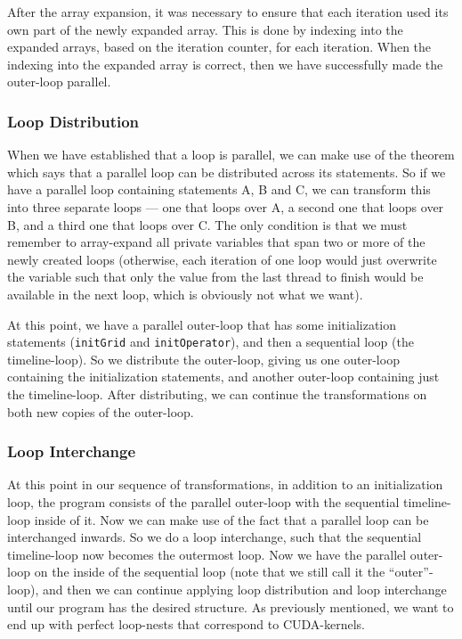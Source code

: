 \documentclass[11pt]{article}
\begin{document}
After the array expansion,
it was necessary to ensure that each iteration used its own part of the newly
expanded array. This is done by indexing into the expanded arrays, based on the
iteration counter, for each iteration. When the indexing into the expanded
array is correct, then we have successfully made the outer-loop parallel.

\subsubsection{Loop Distribution}
When we have established that a loop is parallel, we can make use of the theorem which says that a parallel loop can be distributed across its statements.
So if we have a parallel loop containing statements A, B and C, we can transform this into three separate loops ---
one that loops over A, a second one that loops over B, and a third one that loops over C.
The only condition is that we must remember to array-expand all private variables that span two or more of the newly created loops (otherwise, each iteration of one loop would just overwrite the variable such that only the value from the last thread to finish would be available in the next loop, which is obviously not what we want).

At this point, we have a parallel outer-loop that has some initialization statements (\texttt{initGrid} and \texttt{initOperator}), and then a sequential loop (the timeline-loop).
So we distribute the outer-loop, giving us one outer-loop containing the initialization statements, and another outer-loop containing just the timeline-loop.
After distributing, we can continue the transformations on both new copies of the outer-loop.


\subsubsection{Loop Interchange}
At this point in our sequence of transformations, in addition to an initialization loop, the program consists of the parallel outer-loop with the sequential timeline-loop inside of it.
Now we can make use of the fact that a parallel loop can be interchanged inwards.
So we do a loop interchange, such that the sequential timeline-loop now becomes the outermost loop.
Now we have the parallel outer-loop on the inside of the sequential loop (note that we still call it the ``outer''-loop), and then we can continue applying loop distribution and loop interchange until our program has the desired structure.
As previously mentioned, we want to end up with perfect loop-nests that correspond to CUDA-kernels.
\end{document}
